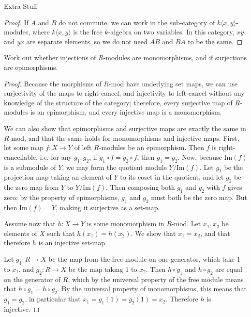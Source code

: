 \documentclass[12pt]{article}
\theoremstyle{definition}
\newenvironment{problem}[2][Problem]{\begin{trivlist}
\item[\hskip \labelsep {\bfseries #1}\hskip \labelsep {\bfseries #2.}]}{\end{trivlist}}
\begin{document}
\begin{section}{Extra Stuff}
\begin{proof}
		If $A$ and $B$ do not commute, we can work in the sub-category of $k\langle x,y\rangle$-modules, where $k\langle x, y\rangle$ is the free $k$-algebra on two variables. In this category, $xy$ and $yx$ are separate elements, so we do not need $AB$ and $BA$ to be the same. 
	\end{proof}
	\begin{problem}{4}
		Work out whether injections of $R$-modules are monomorphisms, and if surjections are epimorphisms.
	\end{problem}
	\begin{proof}
		Because the morphisms of $R$-mod have underlying set maps, we can use surjectivity of the maps to right-cancel, and injectivity to left-cancel without any knowledge of the structure of the category; therefore, every surjective map of $R$-modules is an epimorphism, and every injective map is a monomorphism.
		\par We can also show that epimorphisms and surjective maps are exactly the same in $R$-mod, and that the same holds for monomorphisms and injective maps. First, let some map $f: X \to Y$ of left $R$-modules be an epimorphism. Then $f$ is right-cancellable, i.e. for any $g_1, g_2$, if $g_1 \circ f = g_2 \circ f$, then $g_1 = g_2$. Now, because $\text{Im}(f)$ is a submodule of $Y$, we may form the quotient module $Y / \text{Im}(f)$. Let $g_1$ be the projection map taking an element of $Y$ to its coset in the quotient, and let $g_2$ be the zero map from $Y$ to $Y/\text{Im}(f)$. Then composing both $g_1$ and $g_2$ with $f$ gives zero; by the property of epimorphisms, $g_1$ and $g_2$ must both be the zero map. But then $\text{Im}(f) = Y$, making it surjective as a set-map.
		\par Assume now that $h: X \to Y$ is some monomorphism in $R$-mod. Let $x_1, x_2$ be elements of $X$ such that $h(x_1) = h(x_2)$. We show that $x_1 = x_2$, and that therefore $h$ is an injective set-map. 
		\par Let $g_1 : R \to X$ be the map from the free module on one generator, which take $1$ to $x_1$, and $g_2 : R \to X$ be the map taking $1$ to $x_2$. Then $h \circ g_1$ and $h \circ g_2$ are equal on the generator of $R$, which by the universal property of the free module means that $h \circ g_1 = h \circ g_2$. By the universal property of monomorphisms, this means that $g_1 = g_2$, in particular that $x_1 = g_1(1) = g_2(1) = x_2$. Therefore $h$ is injective.
	\end{proof}
\end{section}
\end{document}
